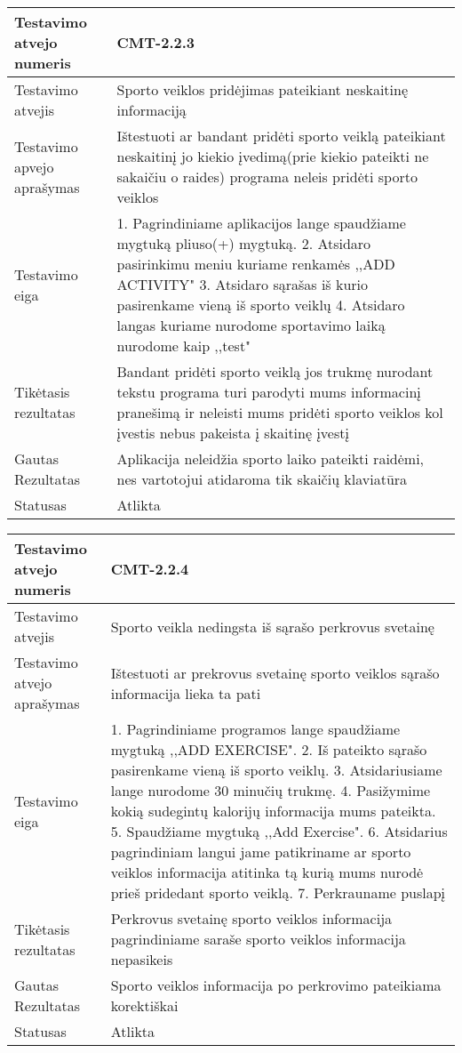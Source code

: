 \documentclass[oneside]{VUMIFPSkursinis}
\begin{document}
\begin{center}
    \begin{tabular}{ |p{5cm}|p{13cm}|}
    \hline
    	Testavimo atvejo numeris & CMT-2.2.3 \\ \hline
    	Testavimo atvejis &Sporto veiklos pridėjimas pateikiant neskaitinę informaciją \\ \hline
	Testavimo apvejo aprašymas & Ištestuoti ar bandant pridėti sporto veiklą pateikiant neskaitinį jo kiekio įvedimą(prie kiekio pateikti ne sakaičiu o raides) programa neleis pridėti sporto veiklos  \\ \hline
	Testavimo eiga & 1. Pagrindiniame aplikacijos lange spaudžiame mygtuką pliuso(+) mygtuką. 
				2. Atsidaro pasirinkimu meniu kuriame renkamės ,,ADD ACTIVITY"
				3. Atsidaro sąrašas iš kurio pasirenkame vieną iš sporto veiklų
				4. Atsidaro langas kuriame nurodome sportavimo laiką nurodome kaip ,,test" \\ \hline
	Tikėtasis rezultatas & Bandant pridėti sporto veiklą jos trukmę nurodant tekstu programa turi parodyti mums informacinį pranešimą ir neleisti mums pridėti sporto veiklos kol įvestis nebus pakeista į skaitinę įvestį \\ \hline
	Gautas Rezultatas & Aplikacija neleidžia sporto laiko pateikti raidėmi, nes vartotojui atidaroma tik skaičių klaviatūra \\ \hline
	Statusas & Atlikta \\ \hline
    \hline
    \end{tabular}
\end{center}

\begin{center}
    \begin{tabular}{ |p{5cm}|p{13cm}|}
    \hline
        Testavimo atvejo numeris & CMT-2.2.4  \\ \hline
        Testavimo atvejis & Sporto veikla nedingsta iš sąrašo perkrovus svetainę  \\ \hline
        Testavimo atvejo aprašymas & Ištestuoti ar prekrovus svetainę sporto veiklos sąrašo informacija lieka ta pati  \\ \hline
        Testavimo eiga &  1. Pagrindiniame programos lange spaudžiame mygtuką ,,ADD EXERCISE". 
				2. Iš pateikto sąrašo pasirenkame vieną iš sporto veiklų. 
				3. Atsidariusiame lange nurodome 30 minučių trukmę.
				4. Pasižymime kokią sudegintų kalorijų informacija mums pateikta. 
				5. Spaudžiame mygtuką ,,Add Exercise".
				6. Atsidarius pagrindiniam langui jame patikriname ar sporto veiklos informacija atitinka tą kurią mums nurodė prieš pridedant sporto veiklą.
				7. Perkrauname puslapį\\ \hline
        Tikėtasis rezultatas &  Perkrovus svetainę sporto veiklos informacija pagrindiniame saraše sporto veiklos informacija nepasikeis\\ \hline
        Gautas Rezultatas & Sporto veiklos informacija po perkrovimo pateikiama korektiškai  \\ \hline
        Statusas & Atlikta  \\ \hline
    \hline
    \end{tabular}
\end{center}
\end{document}
